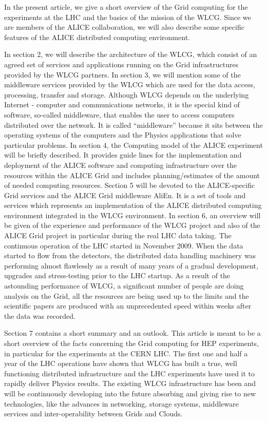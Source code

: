 In the present article, we give a short overview of the Grid
computing for the experiments at the LHC and the basics of the
mission of the WLCG.  Since we are members of the ALICE
collaboration, we will also describe some specific features of the
ALICE distributed computing environment.

In section 2, we will describe the architecture of the WLCG, which
consist of an agreed set of services and applications running on the
Grid infrastructures provided by the WLCG partners. In section 3, we
will mention some of the middleware services provided by the WLCG
which are used for the data access, processing, transfer and
storage. Although WLCG depends on the underlying Internet - computer
and communications networks, it is the special kind of software, so-called
middleware, that enables the user to access computers
distributed over the network. It is called ``middleware'' because it
sits between the operating systems of the computers and the Physics
applications that solve particular problems. In section 4, the
Computing model of the ALICE experiment will be briefly described.
It provides guide lines for the implementation and deployment of the
ALICE software and computing infrastructure over the resources
within the ALICE Grid and includes planning/estimates of the amount
of needed computing resources. Section 5
will be devoted to the ALICE-specific Grid services and the ALICE
Grid middleware AliEn. It is a set of tools and services which
represents an implementation of the ALICE distributed computing
environment integrated in the WLCG environment.  In section 6, an
overview will be given of the experience and performance of the WLCG
project and also of the ALICE Grid project in particular during the
real LHC data taking. The continuous operation of the LHC started in
November 2009.  When the data started to flow from the detectors,
the distributed data handling machinery was performing almost
flawlessly as a result of many years of a gradual development,
upgrades and stress-testing prior to the LHC startup. As a result of
the astounding performance of WLCG, a significant number of people
are doing analysis on the Grid, all the resources are being used up
to the limits and the scientific papers are produced with an
unprecedented speed within weeks after the data was recorded.

Section 7 contains a short summary and an outlook. This article is
meant to be a short overview of the facts concerning the Grid
computing for HEP experiments, in particular for the experiments at
the CERN LHC. The first one and half a year of the LHC operations
have shown that WLCG has built a true, well functioning distributed
infrastructure and the LHC experiments have used it to rapidly
deliver Physics results. The existing WLCG infrastructure has been
and will be continuously developing into the future absorbing and
giving rise to new technologies, like the advances in networking,
storage systems, middleware services and inter-operability between
Grids and Clouds.





